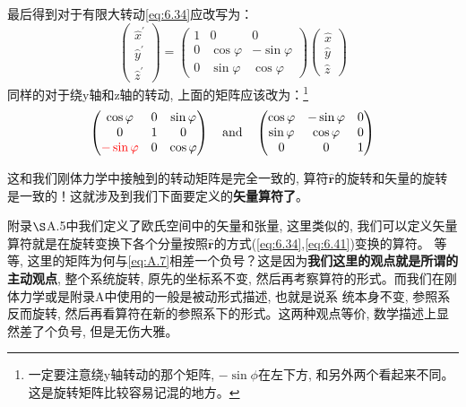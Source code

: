 \documentclass[a4paper,zihao=-4,linespread=1]{ctexrep}
\begin{document}
    最后得到对于有限大转动\ref{eq:6.34}应改写为：
    \begin{equation}
        \left(\begin{array}{l}
            \hat{x}^{\prime} \\
            \hat{y}^{\prime} \\
            \hat{z}^{\prime}
            \end{array}\right)=\left(\begin{array}{ccc}
            1 & 0 & 0 \\
            0 & \cos\varphi & -\sin\varphi \\
            0 & \sin\varphi & \cos\varphi
            \end{array}\right)\left(\begin{array}{l}
            \hat{x} \\ 
            \hat{y} \\
            \hat{z}
            \end{array}\right)
    \end{equation}
    同样的对于绕y轴和z轴的转动, 上面的矩阵应该改为：\footnote{一定要注意绕y轴转动的那个矩阵, $-\sin\phi$在左下方, 和另外两个看起来不同。这是旋转矩阵比较容易记混的地方。}
    \begin{equation}
        \label{eq:6.41}
        \begin{pmatrix}
            \cos\varphi & 0 & \sin\varphi \\
            0 & 1& 0 \\
            {\color{red}-\sin\varphi}& 0  & \cos\varphi
        \end{pmatrix}\quad\text{and}\quad
        \begin{pmatrix}
            \cos\varphi & -\sin\varphi& 0  \\
            \sin\varphi&  \cos\varphi  &0\\
            0 & 0& 1
        \end{pmatrix}
    \end{equation}
    
    这和我们刚体力学中接触到的转动矩阵是完全一致的, 算符$\hat{\mathbf{r}}$的旋转和矢量的旋转是一致的！这就涉及到我们下面要定义的\textbf{矢量算符了}。
    
    附录$\S $A.5中我们定义了欧氏空间中的矢量和张量, 这里类似的, 我们可以定义矢量算符就是在旋转变换下各个分量按照$\hat{\mathbf{r}}$的方式(\ref{eq:6.34},\ref{eq:6.41})变换的算符。
    等等, 这里的矩阵为何与\ref{eq:A.7}相差一个负号？这是因为\textbf{我们这里的观点就是所谓的主动观点}, 整个系统旋转, 原先的坐标系不变, 然后再考察算符的形式。而我们在刚体力学或是附录A中使用的一般是被动形式描述, 也就是说系
    统本身不变, 参照系反而旋转, 然后再看算符在新的参照系下的形式。这两种观点等价, 数学描述上显然差了个负号, 但是无伤大雅。
\end{document}
